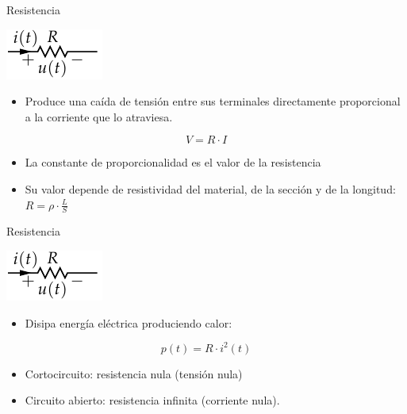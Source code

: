 \documentclass[xcolor={usenames,svgnames,dvipsnames}]{beamer}
\begin{document}
\begin{frame}[label={sec:orgef25b63}]{Resistencia}
\begin{center}
\includegraphics[height=0.2\textheight]{../figs/Resistencia.pdf}
\end{center}


\begin{itemize}
\item \alert{Produce una caída de tensión entre sus terminales directamente
proporcional a la corriente que lo atraviesa}.
\end{itemize}
\[
V=R\cdot I
\]
\begin{itemize}
\item La constante de proporcionalidad es el valor de la resistencia

\item Su valor depende de resistividad del material, de la sección y de la
longitud: \(R=\rho\cdot\frac{L}{S}\)
\end{itemize}
\end{frame}

\begin{frame}[label={sec:org3bd2c6f}]{Resistencia}
\begin{center}
\includegraphics[height=0.2\textheight]{../figs/Resistencia.pdf}
\end{center}


\begin{itemize}
\item Disipa energía eléctrica produciendo \alert{calor}:
\end{itemize}
\[
p(t)=R\cdot i^{2}(t)
\]

\begin{itemize}
\item Cortocircuito: resistencia nula (tensión nula)

\item Circuito abierto: resistencia infinita (corriente nula).
\end{itemize}
\end{frame}
\end{document}
